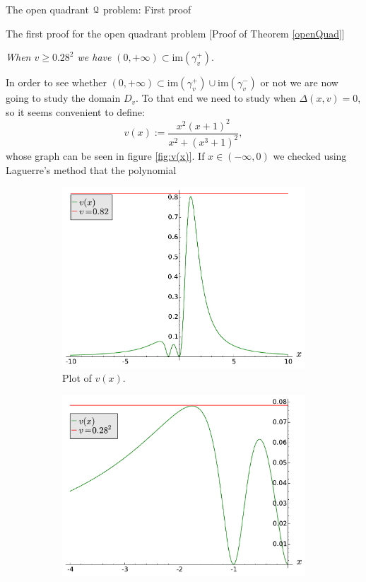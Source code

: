 \documentclass[11pt, a4paper, english, twoside, notitlepage, openright]{report}
\begin{document}
\begin{chapter}{The open quadrant $\mathcal{Q}$ problem: First proof}
\begin{section}{The first proof for the open quadrant problem} [Proof of Theorem \ref{openQuad}]
\begin{center}
 \emph{When $v\geq 0.28^2$ we have} $(0,+\infty)\subset\text{im}(\gamma_v^+)$.
\end{center}\label{step3}
In order to see whether $(0,+\infty)\subset\text{im}(\gamma_v^+)\cup\text{im}(\gamma_v^-)$ or not we are now going to study the domain $D_v$. To that end we need to study when $\Delta(x,v)=0$, so it seems convenient to define:
$$
v(x):=\frac{x^2(x+1)^2}{x^2+(x^3+1)^2},
$$
whose graph can be seen in figure \ref{fig:v(x)}. If $x\in(-\infty,0)$ we checked using Laguerre's method that the polynomial
\begin{figure}[h]\hspace{-0.2cm}
\begin{subfigure}{.5\linewidth}\centering
\includegraphics[width=1\textwidth]{plots/ch1_10_uve.pdf}
\caption{Plot of $v(x)$.\label{fig:uve}}
\end{subfigure}
\begin{subfigure}{.5\linewidth}\centering
\includegraphics[width=1\textwidth]{plots/ch1_11_uve_detail.pdf}

\end{subfigure}
\end{figure}
\end{section}
\end{chapter}
\end{document}
